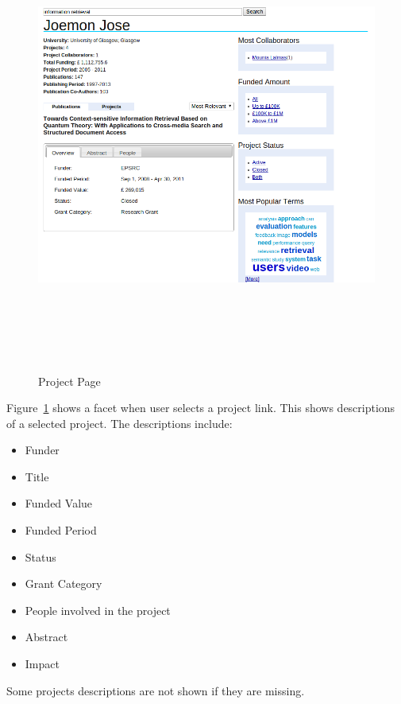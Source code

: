  \begin{figure}
 \centering
 \includegraphics[width=13cm,height=15cm,keepaspectratio]{./figures/newProfileSelectedProject.png}
 \caption{Project Page} \label{fig:newProfileSelectedProject} 
 \end{figure}
 
 Figure~\ref{fig:newProfileSelectedProject} shows a facet when user selects a project link. This shows descriptions of a selected project.
 The descriptions include:
 \begin{itemize}
  \item Funder
  \item Title
  \item Funded Value
  \item Funded Period
  \item Status
  \item Grant Category
  \item People involved in the project
  \item Abstract
  \item Impact
 \end{itemize}
 Some projects descriptions are not shown if they are missing.





